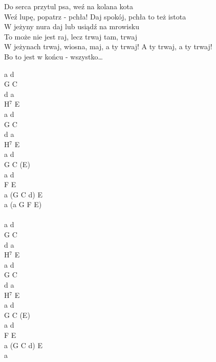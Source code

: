 \documentclass[a5paper, 10pt]{book}
\begin{document}
\begin{minipage}[t]{0.8\textwidth}
\hspace*{5mm}Do serca przytul psa, weź na kolana kota\\
\hspace*{5mm}Weź lupę, popatrz - pchła! Daj spokój, pchła to też istota\\
\hspace*{5mm}W jeżyny nura daj lub usiądź na mrowisku\\
\hspace*{5mm}To może nie jest raj, lecz trwaj tam, trwaj\\
\hspace*{5mm}W jeżynach trwaj, wiosna, maj, a ty trwaj! A ty trwaj, a ty trwaj!\\
\hspace*{5mm}Bo to jest w końcu - wszystko…\\
\end{minipage}
\begin{minipage}[t]{0.2\textwidth}
 a d\\
 G C\\
 d a\\
 H$^7$ E\\

 a d\\
 G C\\
 d a\\
 H$^7$ E\\
 
 a d\\
 G C (E)\\
 a d\\
 F E\\
 a (G C d) E\\
 a (a G F E)\\
\vspace*{10mm}\\
 a d\\
 G C\\
 d a\\
 H$^7$ E\\

  a d\\
 G C\\
 d a\\
 H$^7$ E\\

  a d\\
 G C (E)\\
 a d\\
 F E\\
 a (G C d) E\\
 a \\
\end{minipage}
\end{document}
